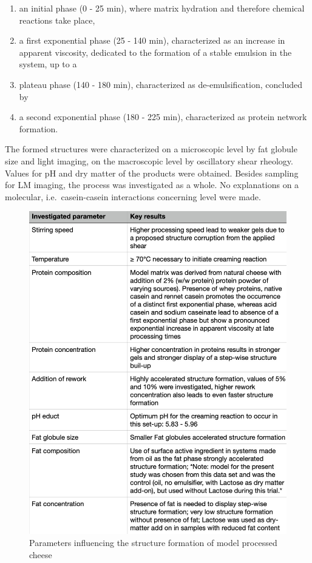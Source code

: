 \documentclass[
]{article}
\providecommand{\tightlist}{%
  \setlength{\itemsep}{0pt}\setlength{\parskip}{0pt}}
\begin{document}
\begin{enumerate}
\def\labelenumi{(\alph{enumi})}
\tightlist
\item
  an initial phase (0 - 25 min), where matrix hydration and therefore
  chemical reactions take place,
\item
  a first exponential phase (25 - 140 min), characterized as an increase
  in apparent viscosity, dedicated to the formation of a stable emulsion
  in the system, up to a\\
\item
  plateau phase (140 - 180 min), characterized as de-emulsification,
  concluded by
\item
  a second exponential phase (180 - 225 min), characterized as protein
  network formation.
\end{enumerate}

The formed structures were characterized on a microscopic level by fat
globule size and light imaging, on the macroscopic level by oscillatory
shear rheology. Values for pH and dry matter of the products were
obtained. Besides sampling for LM imaging, the process was investigated
as a whole. No explanations on a molecular, i.e.~casein-casein
interactions concerning level were made.

\begin{figure}
\centering
\includegraphics{images/lenze_findings.jpg}
\caption{Parameters influencing the structure formation of model
processed cheese}
\end{figure}
\end{document}
